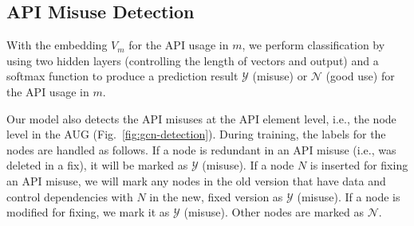 \subsection{API Misuse Detection}


With the embedding $V_m$ for the API usage in $m$, we perform
classification by using two hidden layers (controlling the length of
vectors and output) and a softmax function to produce a prediction
result $\mathcal{Y}$ (misuse) or $\mathcal{N}$ (good use) for the API
usage in $m$.


Our model also detects the API misuses at the API element level, i.e.,
the node level in the AUG (Fig.~\ref{fig:gcn-detection}). During
training, the labels for the nodes are handled as follows. If a node
is redundant in an API misuse (i.e., was deleted in a fix), it will be
marked as $\mathcal{Y}$ (misuse). If a node $N$ is inserted for fixing
an API misuse, we will mark any nodes in the old version that have
data and control dependencies with $N$ in the new, fixed version as
$\mathcal{Y}$ (misuse). If a node is modified for fixing, we mark it
as $\mathcal{Y}$ (misuse). Other nodes are marked as
$\mathcal{N}$.
